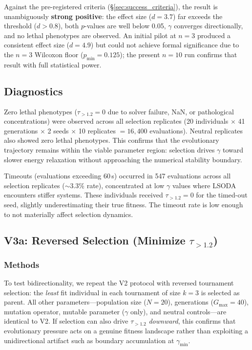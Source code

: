 \documentclass[twocolumn,showpacs,preprintnumbers,amsmath,amssymb,prd,floatfix]{revtex4-2}
\newcommand{\tauexp}{\tau_{>1.2}}
\begin{document}
Against the pre-registered criteria (\S\ref{sec:success_criteria}), the result is unambiguously \textbf{strong positive}: the effect size ($d = 3.7$) far exceeds the threshold ($d > 0.8$), both $p$-values are well below 0.05, $\gamma$ converges directionally, and no lethal phenotypes are observed. An initial pilot at $n = 3$ produced a consistent effect size ($d = 4.9$) but could not achieve formal significance due to the $n = 3$ Wilcoxon floor ($p_\text{min} = 0.125$); the present $n = 10$ run confirms that result with full statistical power.

\subsection{Diagnostics}

Zero lethal phenotypes ($\tauexp = 0$ due to solver failure, NaN, or pathological concentrations) were observed across all selection replicates (20 individuals $\times$ 41 generations $\times$ 2 seeds $\times$ 10 replicates $= 16{,}400$ evaluations). Neutral replicates also showed zero lethal phenotypes. This confirms that the evolutionary trajectory remains within the viable parameter region: selection drives $\gamma$ toward slower energy relaxation without approaching the numerical stability boundary.

Timeouts (evaluations exceeding 60\,s) occurred in 547 evaluations across all selection replicates ($\sim$3.3\% rate), concentrated at low $\gamma$ values where LSODA encounters stiffer systems. These individuals received $\tauexp = 0$ for the timed-out seed, slightly underestimating their true fitness. The timeout rate is low enough to not materially affect selection dynamics.

\subsection{V3a: Reversed Selection (Minimize $\tauexp$)}
\label{sec:v3a}

\subsubsection{Methods}

To test bidirectionality, we repeat the V2 protocol with reversed tournament selection: the \textit{least} fit individual in each tournament of size $k = 3$ is selected as parent. All other parameters---population size ($N = 20$), generations ($G_\text{max} = 40$), mutation operator, mutable parameter ($\gamma$ only), and neutral controls---are identical to V2. If selection can also drive $\tauexp$ \textit{downward}, this confirms that evolutionary pressure acts on a genuine fitness landscape rather than exploiting a unidirectional artifact such as boundary accumulation at $\gamma_\text{min}$.
\end{document}
